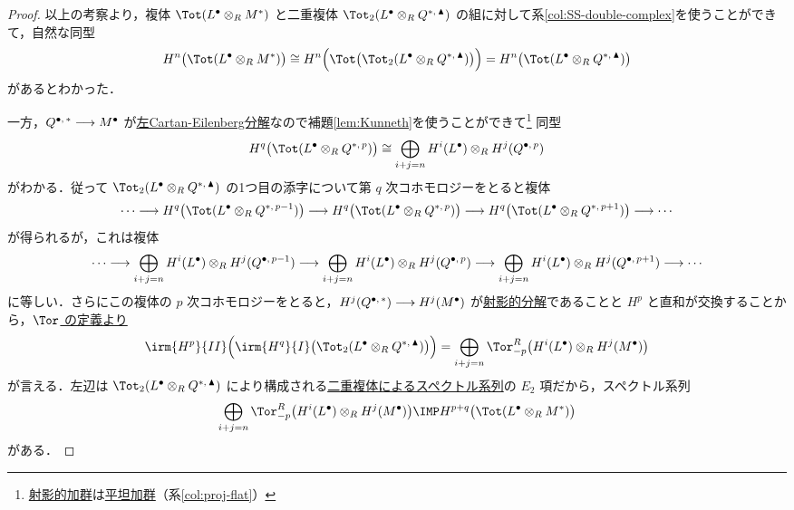 \documentclass[algtopo_main]{subfiles}
\begin{document}
\begin{proof}
    以上の考察より，複体 $\Tot(L^\bullet \otimes_R M^{*})$ と二重複体 $\Tot_2(L^\bullet \otimes_R Q^{*,\, \blacktriangle})$ の組に対して系\ref{col:SS-double-complex}を使うことができて，自然な同型
    \begin{align}
        H^n \bigl( \Tot(L^\bullet \otimes_R M^{*}) \bigr) \cong H^n \Bigl( \Tot \bigl( \Tot_2(L^\bullet \otimes_R Q^{*,\, \blacktriangle})\bigr) \Bigr) = H^n \bigl( \Tot(L^\bullet \otimes_R Q^{*,\, \blacktriangle}) \bigr) 
    \end{align}
    があるとわかった．

    一方，$Q^{\bullet,\, *} \longrightarrow M^\bullet$ が\hyperref[prop:Cartan-Eilenberg-L]{左Cartan-Eilenberg分解}なので補題\ref{lem:Kunneth}を使うことができて\footnote{\hyperref[def:projective-resolution]{射影的加群}は\hyperref[def:flat-mod]{平坦加群}（系\ref{col:proj-flat}）}
    同型
    \begin{align}
        H^q \bigl(\Tot(L^\bullet \otimes_R Q^{*,\, p})  \bigr) \cong \bigoplus_{i+j=n} H^i(L^\bullet) \otimes_R H^j(Q^{\bullet,\, p})
    \end{align}
    がわかる．従って
    $\Tot_2(L^\bullet \otimes_R Q^{*,\, \blacktriangle})$ の1つ目の添字について第 $q$ 次コホモロジーをとると複体
    \begin{align}
        \cdots \lto H^q \bigl( \Tot(L^\bullet \otimes_R Q^{*,\, p-1}) \bigr) \lto H^q \bigl( \Tot(L^\bullet \otimes_R Q^{*,\, p}) \bigr) \lto H^q \bigl( \Tot(L^\bullet \otimes_R Q^{*,\, p+1}) \bigr)  \lto \cdots
    \end{align}
    が得られるが，これは複体
    \begin{align}
        \cdots \longrightarrow \bigoplus_{i+j=n} H^i(L^\bullet) \otimes_R H^j(Q^{\bullet,\, p-1}) \longrightarrow \bigoplus_{i+j=n} H^i(L^\bullet) \otimes_R H^j(Q^{\bullet,\, p}) \longrightarrow \bigoplus_{i+j=n} H^i(L^\bullet) \otimes_R H^j(Q^{\bullet,\, p+1})  \longrightarrow \cdots
    \end{align}
    に等しい．さらにこの複体の $p$ 次コホモロジーをとると，$H^j(Q^{\bullet,\, *}) \longrightarrow H^j(M^\bullet)$ が\hyperref[def:projective-resolution]{射影的分解}であることと $H^p$ と直和が交換することから，\hyperref[def:Tor]{$\Tor$ の定義より}
    \begin{align}
        \irm{H^p}{II} \Bigl( \irm{H^q}{I} \bigl(\Tot_2(L^\bullet \otimes_R Q^{*,\, \blacktriangle})\bigr)\Bigr) = \bigoplus_{i+j=n} \Tor^R_{-p} \bigl( H^i(L^\bullet) \otimes_R H^j(M^{\bullet}) \bigr) 
    \end{align}
    が言える．左辺は $\Tot_2(L^\bullet \otimes_R Q^{*,\, \blacktriangle})$ により構成される\hyperref[SS:double-complex]{二重複体によるスペクトル系列}の $E_2$ 項だから，スペクトル系列
    \begin{align}
        \bigoplus_{i+j=n} \Tor^R_{-p} \bigl( H^i(L^\bullet) \otimes_R H^j(M^{\bullet}) \bigr) \IMP H^{p+q} \bigl( \Tot (L^\bullet \otimes_R M^*) \bigr) 
    \end{align}
    がある．
\end{proof}
\end{document}
